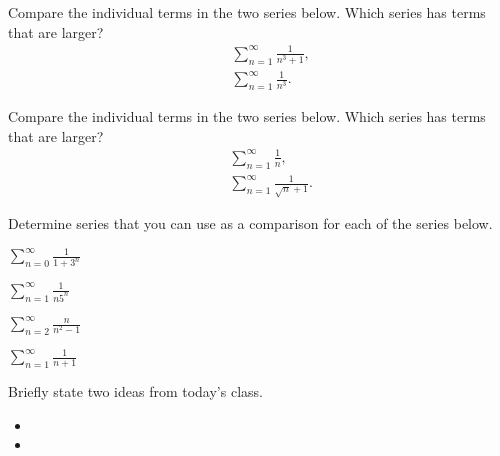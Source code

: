 
\begin{problem}
\item Compare the individual terms in the two series below. Which
  series has terms that are larger?
  \begin{eqnarray*}
    & & \sum^\infty_{n=1} \frac{1}{n^3+1}, \\
    & & \sum^\infty_{n=1} \frac{1}{n^3}.
  \end{eqnarray*}
  \vfill
\item Compare the individual terms in the two series below. Which
  series has terms that are larger?
  \begin{eqnarray*}
    & & \sum^\infty_{n=1} \frac{1}{n}, \\
    & & \sum^\infty_{n=1} \frac{1}{\sqrt{n}+1}.
  \end{eqnarray*}
  \vfill
\end{problem}


\begin{problem}
\item Determine series that you can use as a comparison for each of
  the series below.
  \begin{subproblem}
    \item $\sum_{n=0}^\infty \frac{1}{1+3^n}$
      \vfill
    \item $\sum_{n=1}^\infty \frac{1}{n5^n}$
      \vfill
      \clearpage
    \item $\sum_{n=2}^\infty \frac{n}{n^2-1} $
      \vfill
    \item $\sum_{n=1}^\infty \frac{1}{n+1}$
      \vfill
  \end{subproblem}
\end{problem}


\postClass

\begin{problem}
\item Briefly state two ideas from today's class.
  \begin{itemize}
  \item
  \item
  \end{itemize}
\item
  \begin{subproblem}
    \item
  \end{subproblem}
\end{problem}


